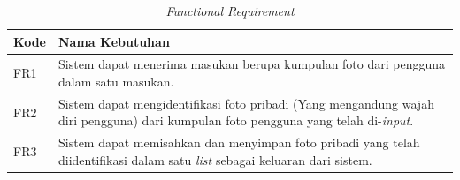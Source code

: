 \begin{table}[t]
	\caption{\textit{Functional Requirement}}
\label{tab:kebutuhan fungsional}
\begin{tabular}{ | p{2cm} | p{10cm} |}
	\hline
	\textbf{Kode} & \textbf{Nama Kebutuhan} \\ \hline
	FR1 & Sistem dapat menerima masukan berupa kumpulan foto dari pengguna dalam satu masukan. \\ \hline
	FR2	& Sistem dapat mengidentifikasi foto pribadi (Yang mengandung wajah diri pengguna) dari kumpulan foto pengguna yang telah di-\textit{input}. \\ \hline
	FR3	& Sistem dapat memisahkan dan menyimpan foto pribadi yang telah diidentifikasi dalam satu \textit{list} sebagai keluaran dari sistem. \\ \hline
\end{tabular}
\end{table}